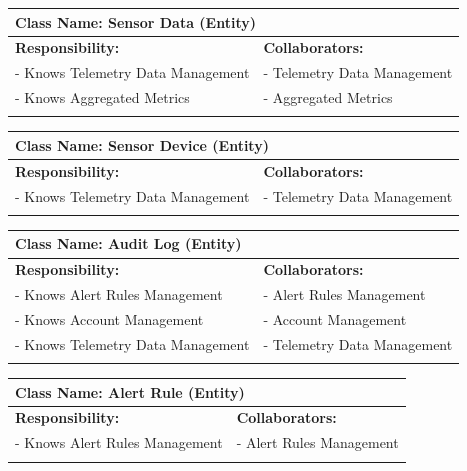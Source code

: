 {	\begin{table}[H]
		\centering
		\begin{tabular}{|p{8cm}|p{8cm}|}
		\hline 
		 \multicolumn{2}{|l|}{\textbf{Class Name:} Sensor Data (Entity)} \\
		\hline
		\textbf{Responsibility:} & \textbf{Collaborators:} \\
		\hline
		 - Knows Telemetry Data Management & - Telemetry Data Management \\
		 - Knows Aggregated Metrics & - Aggregated Metrics \\
		\vspace{1in} & \\
		\hline
		\end{tabular}
	\end{table}

	\begin{table}[H]
		\centering
		\begin{tabular}{|p{8cm}|p{8cm}|}
		\hline 
		 \multicolumn{2}{|l|}{\textbf{Class Name:} Sensor Device (Entity)} \\
		\hline
		\textbf{Responsibility:} & \textbf{Collaborators:} \\
		\hline
		 - Knows Telemetry Data Management & - Telemetry Data Management \\
		\vspace{1in} & \\
		\hline
		\end{tabular}
	\end{table}

	\begin{table}[H]
		\centering
		\begin{tabular}{|p{8cm}|p{8cm}|}
		\hline 
		 \multicolumn{2}{|l|}{\textbf{Class Name:} Audit Log (Entity)} \\
		\hline
		\textbf{Responsibility:} & \textbf{Collaborators:} \\
		\hline
		 - Knows Alert Rules Management & - Alert Rules Management \\
		 - Knows Account Management & - Account Management \\
		 - Knows Telemetry Data Management & - Telemetry Data Management \\
		\vspace{1in} & \\
		\hline
		\end{tabular}
	\end{table}

	\begin{table}[H]
		\centering
		\begin{tabular}{|p{8cm}|p{8cm}|}
		\hline 
		 \multicolumn{2}{|l|}{\textbf{Class Name:} Alert Rule (Entity)} \\
		\hline
		\textbf{Responsibility:} & \textbf{Collaborators:} \\
		\hline
		 - Knows Alert Rules Management & - Alert Rules Management \\
		\vspace{1in} & \\
		\hline
		\end{tabular}
	\end{table}

}
